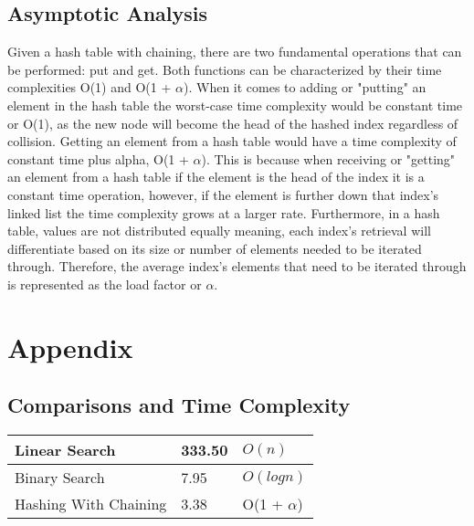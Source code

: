 \documentclass[letterpaper, 10pt,DIV=13]{scrartcl}
\numberwithin{equation}{section} %
\numberwithin{figure}{section} %
\numberwithin{table}{section} %
\begin{document}
\subsection{Asymptotic Analysis}
Given a hash table with chaining, there are two fundamental operations that can be performed: put and get. Both functions can be characterized by their time complexities O(1) and O(1 + $\alpha$). When it comes to adding or "putting" an element in the hash table the worst-case time complexity would be constant time or O(1), as the new node will become the head of the hashed index regardless of collision. Getting an element from a hash table would have a time complexity of constant time plus alpha, O(1 + $\alpha$). This is because when receiving or "getting" an element from a hash table if the element is the head of the index it is a constant time operation, however, if the element is further down that index's linked list the time complexity grows at a larger rate. Furthermore, in a hash table, values are not distributed equally meaning, each index's retrieval will differentiate based on its size or number of elements needed to be iterated through. Therefore, the average index's elements that need to be iterated through is represented as the load factor or $\alpha$.

\pagebreak


\section{Appendix}

\subsection{Comparisons and Time Complexity}
    \begin{center}
        \begin{tabular}{|l|l|l|}
            \hline
            Linear Search & 333.50 & $O(n)$  \\ \hline
            Binary Search & 7.95 & $O(log n)$ \\ \hline
            Hashing With Chaining     & 3.38 & O(1 + $\alpha$) \\ \hline
        \end{tabular}
    \end{center}
\end{document}
